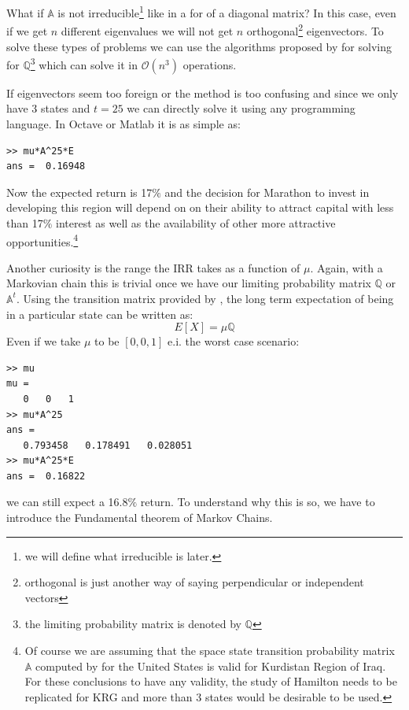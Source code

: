 \documentclass[a4paper,12pt]{article}
\theoremstyle{definition}
\begin{document}
What if $\mathbb{A}$ is not irreducible\footnote{we will define what irreducible is later.} like in a for of a diagonal matrix? In this case, even if we get $n$ different eigenvalues we will not get $n$ orthogonal\footnote{orthogonal is just another way of saying perpendicular or independent vectors} eigenvectors. To solve these types of problems we can use the algorithms proposed by \citep{Lozovanu15} for solving for $\mathbb{Q}$\footnote{the limiting probability matrix is denoted by $\mathbb{Q}$} which can solve it in $\mathcal{O}(n^3)$ operations. 

If eigenvectors seem too foreign or the method is too confusing and since we only have 3 states and $t=25$ we can directly solve it using any programming language. In Octave or Matlab it is as simple as:

\begin{lstlisting}
>> mu*A^25*E
ans =  0.16948
\end{lstlisting}

Now the expected return is 17$\%$ and the decision for Marathon to invest in developing this region will depend on on their ability to attract capital with less than 17$\%$ interest as well as the availability of other more attractive opportunities.\footnote{Of course we are assuming that the space state transition probability matrix $\mathbb{A}$ computed by \cite{hamilton05} for the United States is valid for Kurdistan Region of Iraq. For these conclusions to have any validity, the study of Hamilton needs to be replicated for KRG and more than 3 states would be desirable to be used.}

Another curiosity is the range the IRR takes as a function of $\mu$. Again, with a Markovian chain this is trivial once we have our limiting probability matrix $\mathbb{Q}$ or $\mathbb{A}^t$.  Using the transition matrix provided by \cite{hamilton05}, the long term expectation of being in a particular state can be written as:
\begin{equation}
E[X] = \mu \mathbb{Q}
\end{equation}
Even if we take $\mu$ to be $[0,0,1]$ e.i. the worst case scenario:
\begin{lstlisting}
>> mu
mu =
   0   0   1
>> mu*A^25
ans =
   0.793458   0.178491   0.028051
>> mu*A^25*E
ans =  0.16822
\end{lstlisting}
we can still expect a 16.8$\%$ return. To understand why this is so, we have to introduce the  Fundamental theorem of Markov Chains. 
\end{document}
